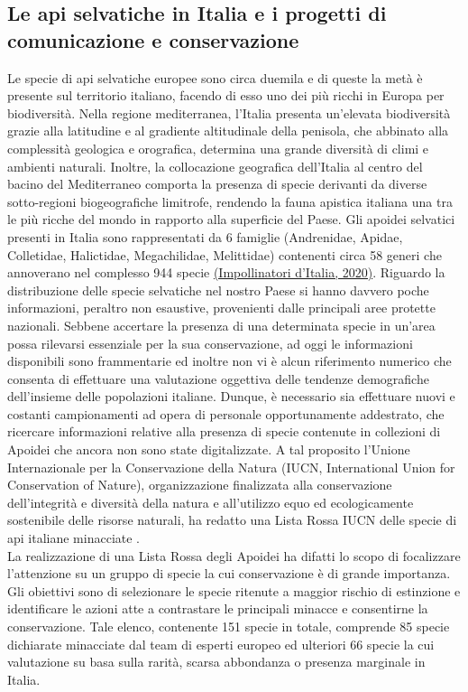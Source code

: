 \documentclass[main.tex]{subfiles}
\begin{document}
\subsection{Le api selvatiche in Italia e i progetti di comunicazione e conservazione}

Le specie di api selvatiche europee sono circa duemila e di queste la metà è presente sul territorio italiano, facendo di esso uno dei più ricchi in Europa per biodiversità. Nella regione mediterranea, l’Italia presenta un’elevata biodiversità grazie alla latitudine e al gradiente altitudinale della penisola, che abbinato alla complessità geologica e orografica, determina una grande diversità di climi e ambienti naturali. Inoltre, la collocazione geografica dell’Italia al centro del bacino del Mediterraneo comporta la presenza di specie derivanti da diverse sotto-regioni biogeografiche limitrofe, rendendo la fauna apistica italiana una tra le più ricche del mondo in rapporto alla superficie del Paese. Gli apoidei selvatici presenti in Italia sono rappresentati da 6 famiglie (Andrenidae, Apidae, Colletidae, Halictidae, Megachilidae, Melittidae) contenenti circa 58 generi che annoverano nel complesso 944 specie \href{https://www.wwf.it/pandanews/ambiente/impollinatori-ditalia/}{(Impollinatori d’Italia, 2020)}.
Riguardo la distribuzione delle specie selvatiche nel nostro Paese si hanno davvero poche informazioni, peraltro non esaustive, provenienti dalle principali aree protette nazionali.
Sebbene accertare la presenza di una determinata specie in un’area possa rilevarsi essenziale per la sua conservazione, ad oggi le informazioni disponibili sono frammentarie ed inoltre non vi è alcun riferimento numerico che consenta di effettuare una valutazione oggettiva delle tendenze demografiche dell’insieme delle popolazioni italiane. Dunque, è necessario sia effettuare nuovi e costanti campionamenti ad opera di personale opportunamente addestrato, che ricercare informazioni relative alla presenza di specie contenute in collezioni di Apoidei che ancora non sono state digitalizzate.
A tal proposito l’Unione Internazionale per la Conservazione della Natura (IUCN, International Union for Conservation of Nature), organizzazione finalizzata alla conservazione dell’integrità e diversità della natura e all’utilizzo equo ed ecologicamente sostenibile delle risorse naturali, ha redatto una Lista Rossa IUCN delle specie di api italiane minacciate \citep{quara}.\\
La realizzazione di una Lista Rossa degli Apoidei ha difatti lo scopo di focalizzare l’attenzione su un gruppo di specie la cui conservazione è di grande importanza. Gli obiettivi sono di selezionare le specie ritenute a maggior rischio di estinzione e identificare le azioni atte a contrastare le principali minacce e consentirne la conservazione. Tale elenco, contenente 151 specie in totale, comprende 85 specie dichiarate minacciate dal team di esperti europeo ed ulteriori 66 specie la cui valutazione su basa sulla rarità, scarsa abbondanza o presenza marginale in Italia.
\end{document}

